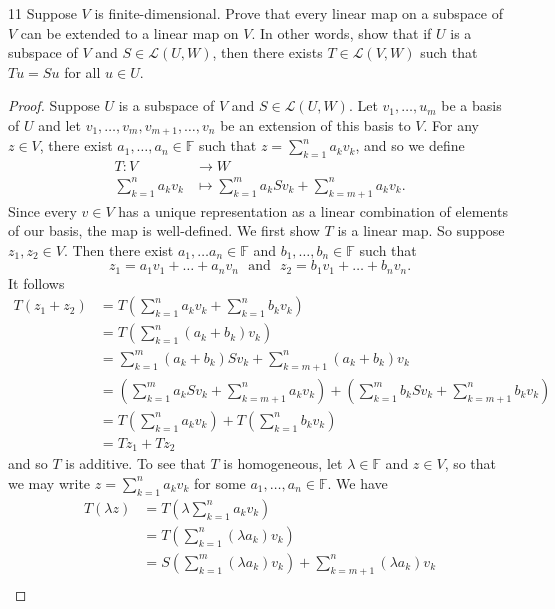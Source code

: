 \documentclass[11pt]{extarticle}
\newenvironment{problem}[1]{\begin{prob*}{#1}{}}{\end{prob*}}
\newcommand{\F}{\mathbb{F}}
\newcommand{\Hom}{\mathcal{L}}
\begin{document}
\begin{problem}{11}
Suppose $V$ is finite-dimensional.  Prove that every linear map on a subspace of $V$ can be extended to a linear map on $V$.  In other words, show that if $U$ is a subspace of $V$ and $S\in\Hom(U,W)$, then there exists $T\in\Hom(V,W)$ such that $Tu = Su$ for all $u\in U$.
\end{problem}
\begin{proof}
Suppose $U$ is a subspace of $V$ and $S\in\Hom(U,W)$.  Let $v_1,\dots, u_m$ be a basis of $U$ and let $v_1,\dots, v_m, v_{m+1},\dots, v_n$ be an extension of this basis to $V$.  For any $z\in V$, there exist $a_1,\dots, a_n\in\F$ such that $z =\sum_{k=1}^na_kv_k$, and so we define 
\begin{align*}
T: V &\to W\\
    \sum_{k = 1}^n a_kv_k &\mapsto \sum_{k = 1}^m a_kSv_k + \sum_{k = m+1}^n a_kv_k.
\end{align*}
Since every $v\in V$ has a unique representation as a linear combination of elements of our basis, the map is well-defined.  We first show $T$ is a linear map.  So suppose $z_1,z_2\in V$.  Then there exist $a_1,\dots a_n\in \F$ and $b_1,\dots, b_n\in\F$ such that 
\begin{equation*}
z_1 = a_1v_1 + \dots + a_nv_n ~~~\text{and}~~~ z_2 = b_1v_1 + \dots + b_nv_n.
\end{equation*}
It follows
\begin{align*}
T(z_1 + z_2) &= T\left(\sum_{k=1}^na_kv_k + \sum_{k=1}^nb_kv_k\right)\\
&= T\left(\sum_{k=1}^n(a_k + b_k)v_k\right)\\
&= \sum_{k=1}^m(a_k + b_k)Sv_k + \sum_{k=m+1}^n(a_k + b_k)v_k\\
&= \left(\sum_{k=1}^ma_kSv_k + \sum_{k=m+1}^na_kv_k\right) + \left(\sum_{k=1}^mb_kSv_k + \sum_{k=m+1}^nb_kv_k\right)\\
&= T\left(\sum_{k=1}^na_kv_k\right) + T\left(\sum_{k=1}^nb_kv_k \right)\\
&= Tz_1 + Tz_2
\end{align*}
and so $T$ is additive.  To see that $T$ is homogeneous, let $\lambda \in\F$ and $z\in V$, so that we may write $z =\sum_{k=1}^na_kv_k$ for some $a_1,\dots,a_n\in\F$. We have
\begin{align*}
T(\lambda z) &= T\left(\lambda \sum_{k=1}^na_kv_k\right)\\
&= T\left(\sum_{k=1}^n(\lambda a_k)v_k\right)\\
&= S\left(\sum_{k=1}^m(\lambda a_k)v_k\right) + \sum_{k=m+1}^n(\lambda a_k)v_k\\

\end{align*}
\end{proof}
\end{document}
